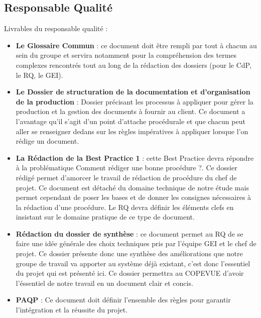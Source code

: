     \subsection{Responsable Qualité}
Livrables du responsable qualité :   
\begin{itemize}
\item \textbf{Le Glossaire Commun} : ce document doit être rempli par tout à chacun au sein du groupe et servira notamment pour la compréhension des termes complexes rencontrés tout au long de la rédaction des dossiers (pour le CdP, le RQ, le GEI).
\item \textbf{Le Dossier de structuration de la documentation et d'organisation de la production} : Dossier précisant les processus à appliquer pour gérer la production et la gestion des documents à fournir au client. Ce document a l'avantage qu'il s'agit d'un point d'attache procédurale et que chacun peut aller se renseigner dedans sur les règles impératives à appliquer lorsque l'on rédige un document.
\item \textbf{La Rédaction de la Best Practice 1} : cette Best Practice devra répondre à la problématique \og Comment rédiger une bonne procédure ?\fg. Ce dossier rédigé permet d'amorcer le travail de rédaction de procédure du chef de projet. Ce document est détaché du domaine technique de notre étude mais permet cependant de poser les bases et de donner les consignes nécessaires à la rédaction d'une procédure. Le RQ devra définir les éléments clefs en insistant sur le domaine pratique de ce type de document.
\item \textbf{Rédaction du dossier de synthèse} : ce document permet au RQ de se faire une idée générale des choix techniques pris par l'équipe GEI et le chef de projet. Ce dossier présente donc une synthèse des améliorations que notre groupe de travail va apporter au système déjà existant, c'est donc l'essentiel du projet qui est présenté ici. Ce dossier permettra au COPEVUE d'avoir l'éssentiel de notre travail en un document clair et concis.
\item \textbf{PAQP} :  Ce document doit définir l’ensemble des règles pour garantir l’intégration et la réussite du projet.
\end{itemize}

